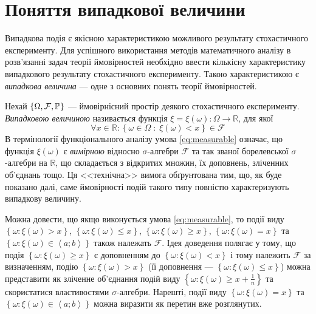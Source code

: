 
\section{Поняття випадкової величини}
Випадкова подія є якісною характеристикою можливого результату стохастичного експерименту.
Для успішного використання методів математичного аналізу в розв'язанні задач теорії ймовірностей
необхідно ввести кількісну характеристику випадкового результату стохастичного експерименту.
Такою характеристикою є \emph{випадкова величина} --- одне з основних понять теорії ймовірностей.
\begin{definition}\label{def:random_variable}
    Нехай $\left\{\Omega, \mathcal{F}, \P \right\}$ --- ймовірнісний простір деякого стохастичного експерименту.
    \emph{Випадковою величиною} називається функція $\xi = \xi(\omega): \Omega 
    \rightarrow \mathbb{R}$, для якої 
    \begin{equation}\label{eq:measurable}
        \forall x \in \mathbb{R}:
        \left\{ \omega \in \Omega\; :\; \xi(\omega) < x\right\} \in \mathcal{F}
    \end{equation} 
    В термінології функціонального аналізу умова \eqref{eq:measurable} означає, що функція $\xi(\omega)$ є
    \emph{вимірною} відносно $\sigma$-алгебри $\mathcal{F}$ та так званої борелевської $\sigma$-алгебри на $\mathbb{R}$,
    що складається з відкритих множин, їх доповнень, зліченних об'єднань тощо. Ця <<технічна>> вимога обґрунтована тим,
    що, як буде показано далі, саме ймовірності подій такого типу повністю характеризують випадкову величину.
\end{definition}
\begin{remark}
    Можна довести, що якщо виконується умова \eqref{eq:measurable}, то події виду
    $\left\{ \omega: \xi(\omega) > x\right\}$, $\left\{ \omega: \xi(\omega) \leq x\right\}$,
    $\left\{ \omega: \xi(\omega) \geq x\right\}$, $\left\{ \omega: \xi(\omega) = x\right\}$ та
    $\left\{ \omega: \xi(\omega) \in \left< a; b\right> \right\}$ також належать $\mathcal{F}$.
    Ідея доведення полягає у тому, що подія $\left\{ \omega: \xi(\omega) \geq x\right\}$ є
    доповненням до $\left\{ \omega: \xi(\omega) < x\right\}$ і тому належить $\mathcal{F}$
    за визначенням, подію $\left\{ \omega: \xi(\omega) > x\right\}$ (її доповнення --- 
    $\left\{ \omega: \xi(\omega) \leq x\right\}$) можна представити
    як зліченне об'єднання подій виду $\left\{ \omega: \xi(\omega) \geq x + \frac{1}{n}\right\}$
    та скористатися властивостями $\sigma$-алгебри.
    Нарешті, події виду $\left\{ \omega: \xi(\omega) = x\right\}$ та
    $\left\{ \omega: \xi(\omega) \in \left< a; b\right> \right\}$
    можна виразити як перетин вже розглянутих.
\end{remark}

